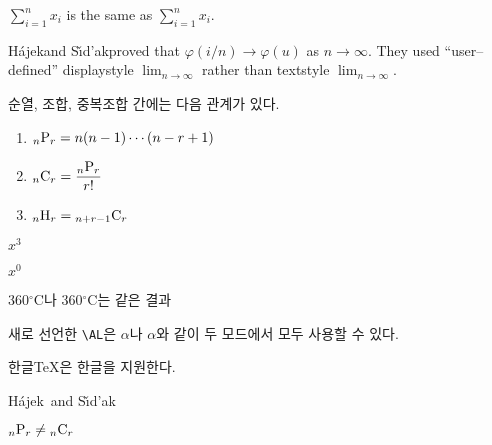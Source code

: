 \documentclass[11pt]{article}
\newcommand{\dsum}[2]{{\displaystyle \sum_{#1}^{#2}}}
\newcommand{\vphi}{\varphi}
\newcommand{\go}{\longrightarrow}
\newcommand{\Hajek}{H\'{a}jek}
\newcommand{\Sidak}{S\v{\i}d'{a}k}
\newcommand{\dlim}[1]{{\displaystyle \lim_{#1}}}
\newcommand{\harcombi}[2]{{}_{#1}{\rm H}_{#2}}
\newcommand{\permut}[2]{{}_{#1}{\rm P}_{#2}}
\newcommand{\combin}[2]{{}_{#1}{\rm C}_{#2}}
\newcommand{\tmp}[1][0]{$\mathrm{R}^{#1}$}
\renewcommand{\tmp}[2][0]{$#2^#1$}
\newcommand{\AL}{\ensuremath{\alpha}}
\newcommand{\htex}{\mbox{한글\TeX}}
\providecommand{\mdegree}[1]{#1\ensuremath{^\circ}}
\newcommand{\HandS}{\Hajek \ and \Sidak}
\newcommand{\pandc}[2]{\permut{#1}{#2} \ne \combin{#1}{#2}}
\begin{document}
$\dsum{i=1}{n} x_i$ is the same as $\sum_{i=1}^n x_i$.

\Hajek and \Sidak proved that $\vphi(i/n)\go\vphi(u)$ as $n\go\infty$. They used ``user--defined'' displaystyle $\dlim{n\go\infty}$ rather than textstyle $\lim_{n\go\infty}$.

순열, 조합, 중복조합 간에는 다음 관계가 있다.
\begin{enumerate}
\item $\permut{n}{r}=n(n-1)\cdots(n-r+1)$
\item $\combin{n}{r}={\displaystyle \frac{\permut{n}{r}}{r!}}$
\item $\harcombi{n}{r}=\combin{n+r-1}{r}$
\end{enumerate}

\tmp[3]{x}

\tmp{x}

\mdegree{360}C나 $\mdegree{360}$C는 같은 결과

새로 선언한 \verb+\AL+은 \AL 나 $\AL$와 같이 두 모드에서 모두 사용할 수 있다.

\htex 은 한글을 지원한다.

\HandS

$\pandc{n}{r}$
\end{document}
